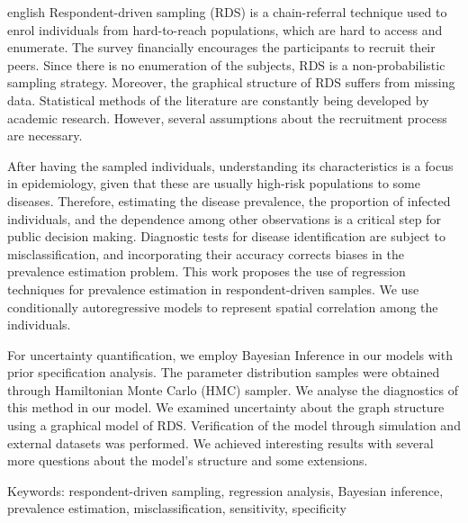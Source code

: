 \setlength{\absparsep}{18pt} 

\begin{resumo}[Abstract]
 \begin{otherlanguage*}{english}
    Respondent-driven sampling (RDS) is a chain-referral technique used to enrol individuals from hard-to-reach populations, which are hard to access and enumerate. The survey financially encourages the participants to recruit their peers. Since there is no enumeration of the subjects, RDS is a non-probabilistic sampling strategy. Moreover, the graphical structure of RDS suffers from missing data. Statistical methods of the literature are constantly being developed by academic research. However, several assumptions about the recruitment process are necessary. 

    After having the sampled individuals, understanding its characteristics is a focus in epidemiology, given that these are usually high-risk populations to some diseases. Therefore, estimating the disease prevalence, the proportion of infected individuals, and the dependence among other observations is a critical step for public decision making. Diagnostic tests for disease identification are subject to misclassification, and incorporating their accuracy corrects biases in the prevalence estimation problem. This work proposes the use of regression techniques for prevalence estimation in respondent-driven samples. We use conditionally autoregressive models to represent spatial correlation among the individuals.

    For uncertainty quantification, we employ Bayesian Inference in our models with prior specification analysis. The parameter distribution samples were obtained through Hamiltonian Monte Carlo (HMC) sampler. We analyse the diagnostics of this method in our model. We examined uncertainty about the graph structure using a graphical model of RDS. Verification of the model through simulation and external datasets was performed. We achieved interesting results with several more questions about the model's structure and some extensions.
 \end{otherlanguage*}

 Keywords: respondent-driven sampling, regression analysis, Bayesian
 inference, prevalence estimation, misclassification, sensitivity, specificity
\end{resumo}

